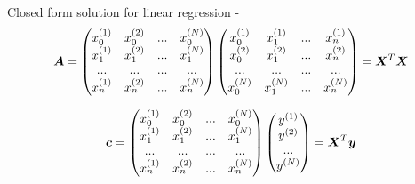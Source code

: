 \begin{frame}[t,allowframebreaks]{Closed form solution for linear regression -}
    \begin{equation}
        \boldsymbol{A} =         
        \begin{pmatrix}
            x_0^{(1)} &  x_0^{(2)} & ... & x_0^{(N)} \\
            x_1^{(1)} &  x_1^{(2)} & ... & x_1^{(N)} \\
            ...       &  ...       & ... & ...       \\
            x_n^{(1)} &  x_n^{(2)} & ... & x_n^{(N)} \\
        \end{pmatrix} 
        \begin{pmatrix}
            x_0^{(1)} &  x_1^{(1)} & ... & x_n^{(1)} \\
            x_0^{(2)} &  x_1^{(2)} & ... & x_n^{(2)} \\
            ...       &  ...       & ... & ...       \\
            x_0^{(N)} &  x_1^{(N)} & ... & x_n^{(N)} \\
        \end{pmatrix} =
        \boldsymbol{X}^{T} \boldsymbol{X}
        \label{eq:linear_regression_closed_form_solution_coupled_equations_A_matrix}
    \end{equation}

    \begin{equation}
        \boldsymbol{c} =  
        \begin{pmatrix}
            x_0^{(1)} &  x_0^{(2)} & ... & x_0^{(N)} \\
            x_1^{(1)} &  x_1^{(2)} & ... & x_1^{(N)} \\
            ...       &  ...       & ... & ...       \\
            x_n^{(1)} &  x_n^{(2)} & ... & x_n^{(N)} \\
        \end{pmatrix} 
        \begin{pmatrix}
            y^{(1)} \\
            y^{(2)} \\
            ...      \\
            y^{(N)} \\
        \end{pmatrix} = 
        \boldsymbol{X}^{T} \boldsymbol{y}
        \label{eq:linear_regression_closed_form_solution_coupled_equations_c_matrix}
    \end{equation}

    \framebreak



\end{frame}
